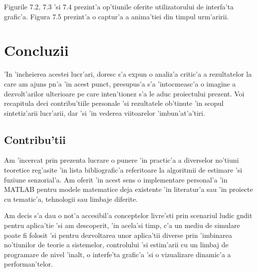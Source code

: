 \documentclass[12pt,a4paper,twoside]{report}
\begin{document}
Figurile 7.2, 7.3 'si 7.4 prezint'a op'tiunile oferite utilizatorului de interfa'ta grafic'a. Figura 7.5 prezint'a o captur'a a anima'tiei din timpul urm'aririi. 


\chapter{Concluzii}


'In 'incheierea acestei lucr'ari, doresc s'a expun o analiz'a critic'a a rezultatelor la care am ajuns p\ia n'a 'in acest punct, presupus'a s'a 'intocmeasc'a o imagine a dezvolt'arilor ulterioare pe care inten'tionez s'a le aduc proiectului prezent. Voi recapitula deci contribu'tiile personale 'si rezultatele ob'tinute 'in scopul sintetiz'arii lucr'arii, dar 'si 'in vederea viitoarelor 'imbun'at'a'tiri.

\section{Contribu'tii}

Am 'incercat prin prezenta lucrare o punere 'in practic'a a diverselor no'tiuni teoretice reg'asite 'in lista bibliografic'a referitoare la algoritmii de estimare 'si fuziune senzorial'a. Am oferit 'in acest sens o implementare personal'a 'in MATLAB pentru modele matematice deja existente 'in literatur'a sau 'in proiecte cu tematic'a, tehnologii sau limbaje diferite.

\vspace{5px}

Am decis s'a dau o not'a accesibil'a conceptelor livre'sti prin scenariul ludic g\ia ndit pentru aplica'tie 'si am descoperit, 'in acela'si timp, c'a un mediu de simulare poate fi folosit 'si pentru dezvoltarea unor aplica'tii diverse prin 'imbinarea no'tiunilor de teorie a sistemelor, controlului 'si estim'arii cu un limbaj de programare de nivel 'inalt, o interfe'ta grafic'a 'si o  vizualizare dinamic'a a performan'telor. 
\end{document}
